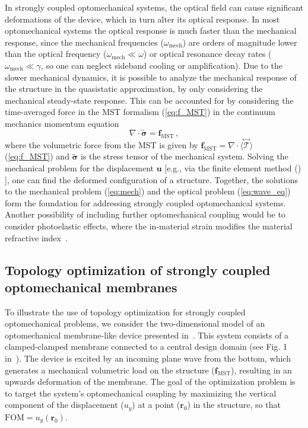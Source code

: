 In strongly coupled optomechanical systems, the optical field can cause significant deformations of the device,
 which in turn alter its optical response. In most optomechanical systems the optical response is much faster than the mechanical response, since the 
mechanical frequencies ($\omega_\text{mech}$) are orders of magnitude lower than the optical frequency ($\omega_\text{mech}\ll\omega$) or optical resonance decay rates ($\omega_\text{mech}\ll\gamma$, so one 
can neglect sideband cooling or amplification)\cite{opto_crys, photo_topopt, ownpub5}. Due to the slower mechanical dynamics, it is possible to analyze the mechanical response of the structure in the quasistatic approximation, by only considering the mechanical steady-state response. 
This can be accounted for by considering the time-averaged force in the MST formalism (\eqref{eq:f_MST}) in the continuum mechanics momentum equation
\begin{equation}\label{eq:mech}
    \nabla \cdot \overleftrightarrow{\boldsymbol{\sigma}} = \mathbf{f}_\text{MST}  \,,
\end{equation}
where the volumetric force from the MST is given by $ \mathbf{f}_\text{MST} = \nabla \cdot \langle \stackrel{\leftrightarrow}{\bm{\mathcal{T}}} \rangle$ (\eqref{eq:f_MST}) and $\overleftrightarrow{\boldsymbol{\sigma}}$ is the stress tensor of the mechanical system. Solving the mechanical problem for the
displacement $\mathbf{u}$ [e.g., via the finite element method () \cite{cook_concepts_2001}], one can find the deformed configuration of a structure. Together, the 
solutions to the mechanical problem (\eqref{eq:mech}) and the optical problem (\eqref{eq:wave_eq}) 
form the foundation for addressing strongly coupled optomechanical systems. Another possibility of including further optomechanical coupling would be to consider
photoelastic effects, where the in-material strain modifies the material refractive index~\cite{photoelasticity}.

\subsection*{Topology optimization of strongly coupled optomechanical membranes}

To illustrate the use of topology optimization for strongly coupled optomechanical problems, we consider the two-dimensional model of an optomechanical membrane-like device presented in~\cite{ownpub5}. 
This system consists of a clamped-clamped membrane connected to a central design domain (see Fig. 1 in~\cite{ownpub5}). The device is excited by an incoming plane wave from the bottom, which generates a mechanical volumetric load on the structure ($\mathbf{f}_\text{MST}$),
resulting in an upwards deformation of the membrane. The goal of the optimization problem is to target the system's optomechanical coupling by maximizing the vertical component of the displacement ($u_y$) at a point ($\mathbf{r}_0$)
in the structure, so that $\text{FOM}=u_y(\mathbf{r}_0)$.

